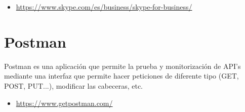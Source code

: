 \begin{itemize}
	\item \url{https://www.skype.com/es/business/skype-for-business/}
\end{itemize}

\section{Postman}

Postman es una aplicación que permite la prueba y monitorización de API's mediante una interfaz que permite hacer peticiones de diferente tipo (GET, POST, PUT...), modificar las cabeceras, etc.

\begin{itemize}
	\item \url{https://www.getpostman.com/}
\end{itemize}